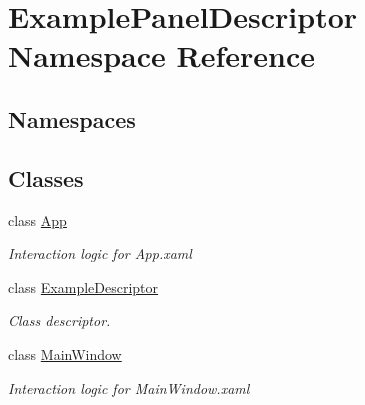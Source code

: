 \hypertarget{namespace_example_panel_descriptor}{}\section{Example\+Panel\+Descriptor Namespace Reference}
\label{namespace_example_panel_descriptor}
\subsection*{Namespaces}
\begin{DoxyCompactItemize}
\end{DoxyCompactItemize}
\subsection*{Classes}
\begin{DoxyCompactItemize}
\item 
class \mbox{\hyperlink{class_example_panel_descriptor_1_1_app}{App}}
\begin{DoxyCompactList}\small\item\em Interaction logic for App.\+xaml \end{DoxyCompactList}\item 
class \mbox{\hyperlink{class_example_panel_descriptor_1_1_example_descriptor}{Example\+Descriptor}}
\begin{DoxyCompactList}\small\item\em Class descriptor. \end{DoxyCompactList}\item 
class \mbox{\hyperlink{class_example_panel_descriptor_1_1_main_window}{Main\+Window}}
\begin{DoxyCompactList}\small\item\em Interaction logic for Main\+Window.\+xaml \end{DoxyCompactList}\end{DoxyCompactItemize}
